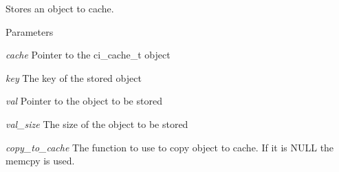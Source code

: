 Stores an object to cache. 
\begin{DoxyParams}{Parameters}
\item[{\em cache}]Pointer to the ci\_\-cache\_\-t object \item[{\em key}]The key of the stored object \item[{\em val}]Pointer to the object to be stored \item[{\em val\_\-size}]The size of the object to be stored \item[{\em copy\_\-to\_\-cache}]The function to use to copy object to cache. If it is NULL the memcpy is used. \end{DoxyParams}
